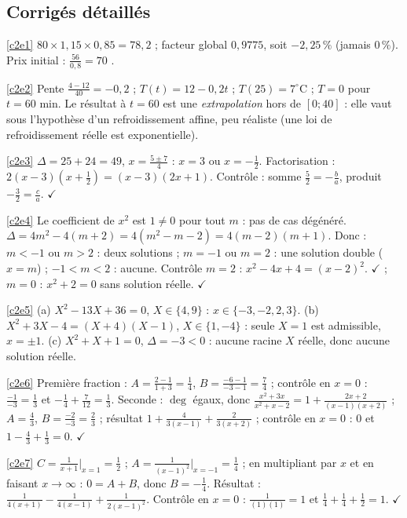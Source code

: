 \subsection{Corrigés détaillés}
\begin{corrige}{\ref{c2e1}}
$80\times1{,}15\times0{,}85=78{,}2$ \texteuro{} ; facteur global $0{,}9775$, soit $-2{,}25\,\%$ (jamais $0\,\%$). Prix initial : $\frac{56}{0{,}8}=70$ \texteuro{}.
\end{corrige}
\begin{corrige}{\ref{c2e2}}
Pente $\frac{4-12}{40}=-0{,}2$ ; $T(t)=12-0{,}2t$ ; $T(25)=7^\circ$C ; $T=0$ pour $t=60$ min. Le résultat à $t=60$ est une \emph{extrapolation} hors de $[0;40]$ : elle vaut sous l'hypothèse d'un refroidissement affine, peu réaliste (une loi de refroidissement réelle est exponentielle).
\end{corrige}
\begin{corrige}{\ref{c2e3}}
$\Delta=25+24=49$, $x=\frac{5\pm7}4$ : $x=3$ ou $x=-\frac12$. Factorisation : $2(x-3)(x+\frac12)=(x-3)(2x+1)$. Contrôle : somme $\frac52=-\frac ba$, produit $-\frac32=\frac ca$. $\checkmark$
\end{corrige}
\begin{corrige}{\ref{c2e4}}
Le coefficient de $x^2$ est $1\ne0$ pour tout $m$ : pas de cas dégénéré. $\Delta=4m^2-4(m+2)=4(m^2-m-2)=4(m-2)(m+1)$. Donc : $m<-1$ ou $m>2$ : deux solutions ; $m=-1$ ou $m=2$ : une solution double ($x=m$) ; $-1<m<2$ : aucune. Contrôle $m=2$ : $x^2-4x+4=(x-2)^2$. $\checkmark$ ; $m=0$ : $x^2+2=0$ sans solution réelle. $\checkmark$
\end{corrige}
\begin{corrige}{\ref{c2e5}}
(a) $X^2-13X+36=0$, $X\in\{4,9\}$ : $x\in\{-3,-2,2,3\}$. (b) $X^2+3X-4=(X+4)(X-1)$, $X\in\{1,-4\}$ : seule $X=1$ est admissible, $x=\pm1$. (c) $X^2+X+1=0$, $\Delta=-3<0$ : aucune racine $X$ réelle, donc aucune solution réelle.
\end{corrige}
\begin{corrige}{\ref{c2e6}}
Première fraction : $A=\frac{2-1}{1+3}=\frac14$, $B=\frac{-6-1}{-3-1}=\frac74$ ; contrôle en $x=0$ : $\frac{-1}{-3}=\frac13$ et $-\frac14+\frac7{12}=\frac13$. Seconde : $\deg$ égaux, donc $\frac{x^2+3x}{x^2+x-2}=1+\frac{2x+2}{(x-1)(x+2)}$ ; $A=\frac{4}{3}$, $B=\frac{-2}{-3}=\frac23$ ; résultat $1+\frac4{3(x-1)}+\frac2{3(x+2)}$ ; contrôle en $x=0$ : $0$ et $1-\frac43+\frac13=0$. $\checkmark$
\end{corrige}
\begin{corrige}{\ref{c2e7}}
$C=\frac1{x+1}\big|_{x=1}=\frac12$ ; $A=\frac1{(x-1)^2}\big|_{x=-1}=\frac14$ ; en multipliant par $x$ et en faisant $x\to\infty$ : $0=A+B$, donc $B=-\frac14$. Résultat : $\frac1{4(x+1)}-\frac1{4(x-1)}+\frac1{2(x-1)^2}$. Contrôle en $x=0$ : $\frac1{(1)(1)}=1$ et $\frac14+\frac14+\frac12=1$. $\checkmark$
\end{corrige}
